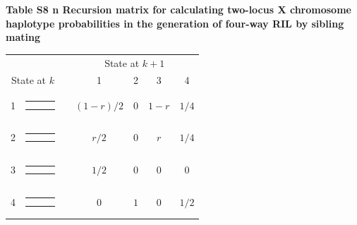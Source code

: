 \documentclass[9pt,letterpaper,twoside]{article}
\begin{document}
{}

\newpage


\noindent \textbf{Table S8 {\color{white} n} Recursion matrix for calculating
two-locus X chromosome haplotype probabilities in the generation of four-way RIL by
sibling mating}

\bigskip

{
{ \small \renewcommand{\arraystretch}{1.1}
\begin{center}
\begin{tabular}{ccccccc} \hline
 & & &\multicolumn{4}{c}{State at $k+1$} \\
\cline{4-7}
\multicolumn{2}{c}{State at $k$} & 
& 1& 2& 3& 4\\ \hline 
1 &
{\renewcommand{\arraystretch}{0.3}
\renewcommand{\tabcolsep}{0.5mm}
\parbox[b][3mm][c]{12mm}{
\begin{tabular}{|p{2mm}|p{2mm}||p{2mm}|} \hline
$\bullet$ &           &           \\
$\bullet$ &           &           \\ \hline
\end{tabular}}}
&
& $(1-r)/2$
& $0$
& $1-r$
& $1/4$
\\
2 &
{\renewcommand{\arraystretch}{0.3}
\renewcommand{\tabcolsep}{0.5mm}
\parbox[b][3mm][c]{12mm}{
\begin{tabular}{|p{2mm}|p{2mm}||p{2mm}|} \hline
$\bullet$ &           &           \\
          & $\bullet$ &           \\ \hline
\end{tabular}}}
&
& $r/2$
& $0$
& $r$
& $1/4$
\\
3 &
{\renewcommand{\arraystretch}{0.3}
\renewcommand{\tabcolsep}{0.5mm}
\parbox[b][3mm][c]{12mm}{
\begin{tabular}{|p{2mm}|p{2mm}||p{2mm}|} \hline
          &           & $\bullet$ \\
          &           & $\bullet$ \\ \hline
\end{tabular}}}
&
& $1/2$
& $0$
& $0$
& $0$
\\
4 &
{\renewcommand{\arraystretch}{0.3}
\renewcommand{\tabcolsep}{0.5mm}
\parbox[b][3mm][c]{12mm}{
\begin{tabular}{|p{2mm}|p{2mm}||p{2mm}|} \hline
$\bullet$ &           &           \\
          &           & $\bullet$ \\ \hline
\end{tabular}}}
&
& $0$
& $1$
& $0$
& $1/2$
\\
\hline
\end{tabular}
\end{center} }
}
\end{document}
